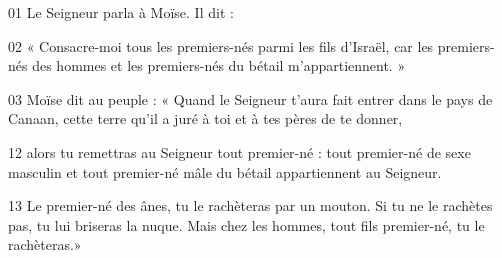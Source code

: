01 Le Seigneur parla à Moïse. Il dit :

02 « Consacre-moi tous les premiers-nés parmi les fils d’Israël, car les premiers-nés des hommes et les premiers-nés du bétail m’appartiennent. »

03 Moïse dit au peuple : « Quand le Seigneur t’aura fait entrer dans le pays de Canaan, cette terre qu’il a juré à toi et à tes pères de te donner,

12 alors tu remettras au Seigneur tout premier-né : tout premier-né de sexe masculin et tout premier-né mâle du bétail appartiennent au Seigneur.

13 Le premier-né des ânes, tu le rachèteras par un mouton. Si tu ne le rachètes pas, tu lui briseras la nuque. Mais chez les hommes, tout fils premier-né, tu le rachèteras.»